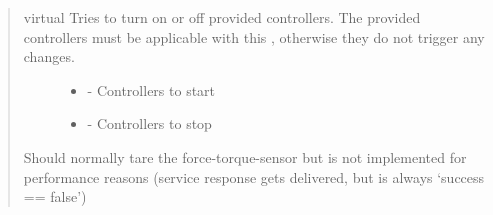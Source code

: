 \documentclass[letterpaper,10pt,english]{sphinxmanual}
\begin{document}
\begin{quote}
\begin{fulllineitems}
\begin{fulllineitems}
\label{\detokenize{HardwareInterface:_CPPv2N21coppeliasim_interface17HardwareInterface8doSwitchERKNSt4listIN18hardware_interface14ControllerInfoEEERKNSt4listIN18hardware_interface14ControllerInfoEEE}}%
\pysigstartmultiline
virtual \label{\detokenize{HardwareInterface:project0classcoppeliasim__interface_1_1HardwareInterface_1aae36a63c5125172387cfcbf21f9a1c24}}%
\pysigstopmultiline
Tries to turn on or off provided controllers. The provided controllers must be applicable with this {\hyperref[\detokenize{HardwareInterface:project0classcoppeliasim__interface_1_1HardwareInterface}]{}}, otherwise they do not trigger any changes. 

\begin{description}
\item[{}] \leavevmode\begin{itemize}
\item {}  - 
Controllers to start 

\item {}  - 
Controllers to stop 

\end{itemize}

\end{description}


\end{fulllineitems}


\begin{fulllineitems}
\label{\detokenize{HardwareInterface:_CPPv2N21coppeliasim_interface17HardwareInterface12zeroFTSensorERN8std_srvs14TriggerRequestERN8std_srvs15TriggerResponseE}}%
\pysigstartmultiline
{}\label{\detokenize{HardwareInterface:project0classcoppeliasim__interface_1_1HardwareInterface_1af3204245bbf1e9e317d5d0a57b3c86c2}}%
\pysigstopmultiline
Should normally tare the force-torque-sensor but is not implemented for performance reasons (service response gets delivered, but is always ‘success == false’) 


\end{fulllineitems}
\end{fulllineitems}
\end{quote}
\end{document}
